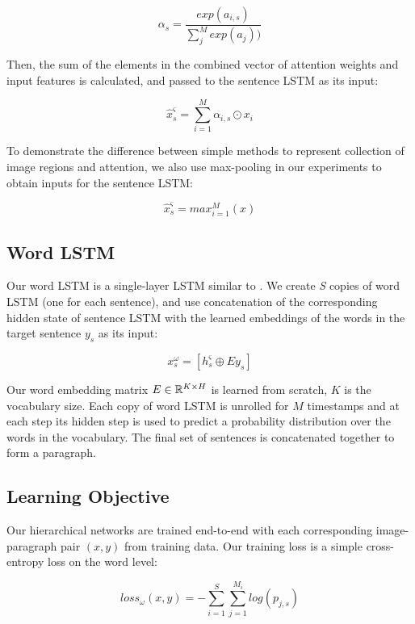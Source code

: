 \documentclass[11pt,a4paper]{article}
\newcommand{\R}{\mathbb{R}}
\begin{document}
\begin{equation}
    \alpha_s = \frac{exp(a_{i,s})}{\sum_{j}^{M}exp(a_j))}
\end{equation}

Then, the sum of the elements in the combined vector of attention weights and input features is calculated, and passed to the sentence LSTM as its input:

\begin{equation}
    \hat{x}^\varsigma_s = \sum_{i=1}^{M} \alpha_{i,s} \odot x_i
\end{equation}

To demonstrate the difference between simple methods to represent collection of image regions and attention, we also use max-pooling in our experiments to obtain inputs for the sentence LSTM:

\begin{equation}
    \hat{x}^\varsigma_s =  max_{i=1}^M(x)
\end{equation}

\subsection{Word LSTM}
Our word LSTM is a single-layer LSTM similar to .
We create \textit{S} copies of word LSTM (one for each sentence), and use concatenation of the corresponding hidden state of sentence LSTM with the learned embeddings of the words in the target sentence $y_s$ as its input:

\begin{equation}
   x^\omega_s = [h^\varsigma_s \oplus Ey_s ]
\end{equation}

Our word embedding matrix $E \in \R\sp{K \times H}$ is learned from scratch, $K$ is the vocabulary size.
Each copy of word LSTM is unrolled for $M$ timestamps and at each step its hidden step is used to predict a probability distribution over the words in the vocabulary.
The final set of sentences is concatenated together to form a paragraph.

\subsection{Learning Objective}
Our hierarchical networks are trained end-to-end with each corresponding image-paragraph pair $(x, y)$ from training data.
Our training loss is a simple cross-entropy loss on the word level:

\begin{equation}
    loss_{\omega}(x, y) = - \sum_{i=1}^{S}\sum_{j=1}^{M_i} log(p_{j,s})
\end{equation}
\end{document}
